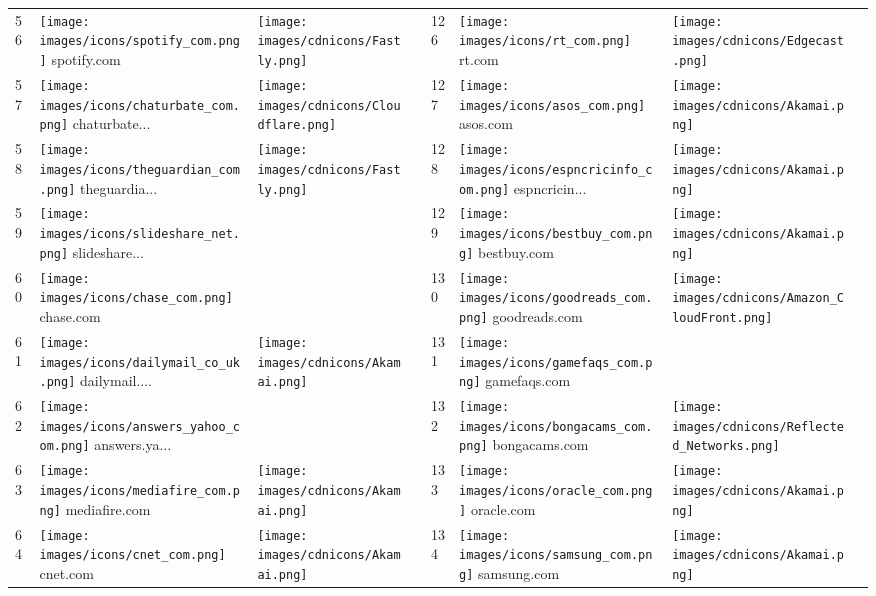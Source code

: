 \begin{table}[tbp]
\begin{tabular}{|llll|llll|}
56 & \texttt{[image: images/icons/spotify\_com.png]} spotify.com & \texttt{[image: images/cdnicons/Fastly.png]} & & 126 & \texttt{[image: images/icons/rt\_com.png]} rt.com & \texttt{[image: images/cdnicons/Edgecast.png]} & \\
57 & \texttt{[image: images/icons/chaturbate\_com.png]} chaturbate... & \texttt{[image: images/cdnicons/Cloudflare.png]} & & 127 & \texttt{[image: images/icons/asos\_com.png]} asos.com & \texttt{[image: images/cdnicons/Akamai.png]} & \\
58 & \texttt{[image: images/icons/theguardian\_com.png]} theguardia... & \texttt{[image: images/cdnicons/Fastly.png]} & & 128 & \texttt{[image: images/icons/espncricinfo\_com.png]} espncricin... & \texttt{[image: images/cdnicons/Akamai.png]} & \\
59 & \texttt{[image: images/icons/slideshare\_net.png]} slideshare... & & & 129 & \texttt{[image: images/icons/bestbuy\_com.png]} bestbuy.com & \texttt{[image: images/cdnicons/Akamai.png]} & \\
60 & \texttt{[image: images/icons/chase\_com.png]} chase.com & & & 130 & \texttt{[image: images/icons/goodreads\_com.png]} goodreads.com & \texttt{[image: images/cdnicons/Amazon\_CloudFront.png]} & \\
61 & \texttt{[image: images/icons/dailymail\_co\_uk.png]} dailymail.... & \texttt{[image: images/cdnicons/Akamai.png]} & & 131 & \texttt{[image: images/icons/gamefaqs\_com.png]} gamefaqs.com & & \\
62 & \texttt{[image: images/icons/answers\_yahoo\_com.png]} answers.ya... & & & 132 & \texttt{[image: images/icons/bongacams\_com.png]} bongacams.com & \texttt{[image: images/cdnicons/Reflected\_Networks.png]} & \\
63 & \texttt{[image: images/icons/mediafire\_com.png]} mediafire.com & \texttt{[image: images/cdnicons/Akamai.png]} & & 133 & \texttt{[image: images/icons/oracle\_com.png]} oracle.com & \texttt{[image: images/cdnicons/Akamai.png]} & \\
64 & \texttt{[image: images/icons/cnet\_com.png]} cnet.com & \texttt{[image: images/cdnicons/Akamai.png]} & & 134 & \texttt{[image: images/icons/samsung\_com.png]} samsung.com & \texttt{[image: images/cdnicons/Akamai.png]} & \\

\end{tabular}
\end{table}
